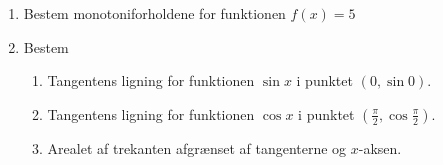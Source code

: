 \begin{enumerate}
	\item Bestem monotoniforholdene for funktionen $f(x)=5$
	
	\item Bestem
	\begin{enumerate}
		\item Tangentens ligning for funktionen $\sin x$ i punktet $(0,\sin 0)$.
		\item Tangentens ligning for funktionen $\cos x$ i punktet $(\frac{\pi}{2},\cos \frac{\pi}{2})$.
		\item Arealet af trekanten afgrænset af tangenterne og $x$-aksen.
	\end{enumerate}


\end{enumerate}